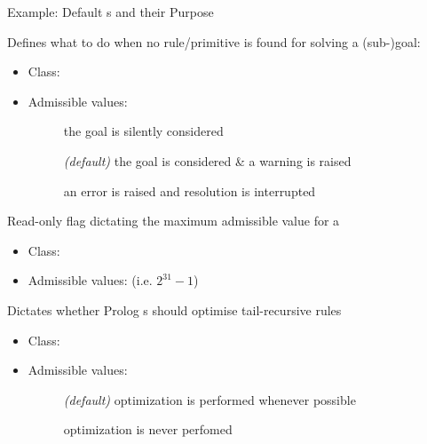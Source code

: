 \documentclass[handout]{beamer}
\begin{document}
\begin{frame}[allowframebreaks]{Example: Default s and their Purpose}

    \begin{block}{}
        Defines what to do when no rule/primitive is found for solving a (sub-)goal:
        \begin{itemize}
            \item Class: 
            \item Admissible values:
            \begin{description}
                \item[] the goal is silently considered 
                \item[] \emph{(default)}  the goal is considered  \& a warning is raised
                \item[] an error is raised and resolution is interrupted
            \end{description}
        \end{itemize}
    \end{block}

    \begin{block}{}
        Read-only flag dictating the maximum admissible value for a 
        \begin{itemize}
            \item Class: 
            \item Admissible values:  (i.e. $2^{31} - 1$)
        \end{itemize}
    \end{block}

    \begin{block}{}
        Dictates whether Prolog s should optimise \alert{tail-recursive} rules
        \begin{itemize}
            \item Class: 
            \item Admissible values:
            \begin{description}
                \item[] \emph{(default)} optimization is performed whenever possible
                \item[] optimization is never perfomed
            \end{description}
        \end{itemize}
    \end{block}


\end{frame}
\end{document}
